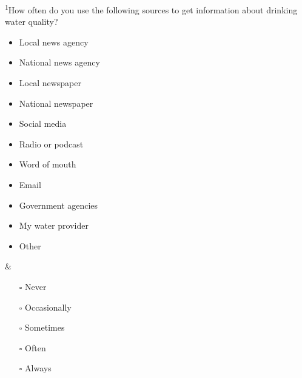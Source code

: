 \documentclass[
]{article}
\begin{document}
\begin{longtblr}[         %
caption={},
entry=none,label=none,
note{1}={Matrix style question.},
label=tblr:quest,
caption={Survey questions.},
]
\textsuperscript{1}How often do you use the following sources to get information about drinking water quality?    \begin{itemize}[nosep]    \item Local news agency    \item National news agency    \item Local newspaper    \item National newspaper    \item Social media    \item Radio or podcast    \item Word of mouth    \item Email    \item Government agencies    \item My water provider    \item Other    \end{itemize} & \begin{itemize}[nosep]    \item[$\square$] Never    \item[$\square$] Occasionally    \item[$\square$] Sometimes    \item[$\square$] Often    \item[$\square$] Always    \end{itemize}                                                                                                                                                                                                                                                                                                                                                                                                                                        \\
\bottomrule
\end{longtblr}
\end{document}
